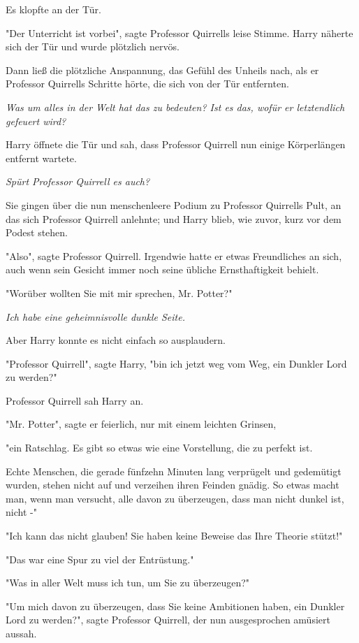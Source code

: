 {Es klopfte an der Tür.

"Der Unterricht ist vorbei", sagte Professor Quirrells leise Stimme. Harry näherte sich der Tür und wurde plötzlich nervös.

Dann ließ die plötzliche Anspannung, das Gefühl des Unheils nach, als er Professor Quirrells Schritte hörte, die sich von der Tür entfernten.

\emph{Was um alles in der Welt hat das zu bedeuten? Ist es das, wofür er letztendlich gefeuert wird?}

Harry öffnete die Tür und sah, dass Professor Quirrell nun einige Körperlängen entfernt wartete.

\emph{Spürt Professor Quirrell es auch?}

Sie gingen über die nun menschenleere Podium zu Professor Quirrells Pult, an das sich Professor Quirrell anlehnte; und Harry blieb, wie zuvor, kurz vor dem Podest stehen.

"Also", sagte Professor Quirrell. Irgendwie hatte er etwas Freundliches an sich, auch wenn sein Gesicht immer noch seine übliche Ernsthaftigkeit behielt.

"Worüber wollten Sie mit mir sprechen, Mr. Potter?"

\emph{Ich habe eine geheimnisvolle dunkle Seite.}

Aber Harry konnte es nicht einfach so ausplaudern.

"Professor Quirrell", sagte Harry, "bin ich jetzt weg vom Weg, ein Dunkler Lord zu werden?"

Professor Quirrell sah Harry an.

"Mr. Potter", sagte er feierlich, nur mit einem leichten Grinsen,

"ein Ratschlag. Es gibt so etwas wie eine Vorstellung, die zu perfekt ist.

Echte Menschen, die gerade fünfzehn Minuten lang verprügelt und gedemütigt wurden, stehen nicht auf und verzeihen ihren Feinden gnädig. So etwas macht man, wenn man versucht, alle davon zu überzeugen, dass man nicht dunkel ist, nicht -"

"Ich kann das nicht glauben! Sie haben keine Beweise das Ihre Theorie stützt!"

"Das war eine Spur zu viel der Entrüstung."

"Was in aller Welt muss ich tun, um Sie zu überzeugen?"

"Um mich davon zu überzeugen, dass Sie keine Ambitionen haben, ein Dunkler Lord zu werden?", sagte Professor Quirrell, der nun ausgesprochen amüsiert aussah.

}

